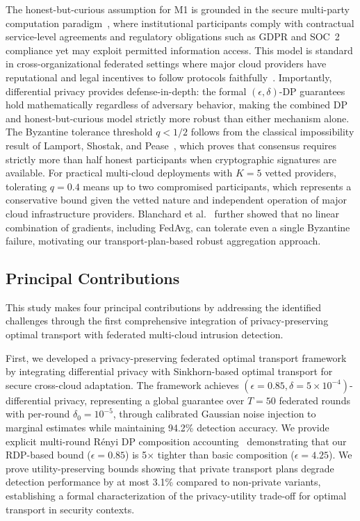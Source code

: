 \documentclass{ieeeaccess}
\theoremstyle{plain}
\theoremstyle{definition}
\theoremstyle{remark}
\begin{document}
The honest-but-curious assumption for M1 is grounded in the secure multi-party computation paradigm~\cite{goldreich2004}, where institutional participants comply with contractual service-level agreements and regulatory obligations such as GDPR and SOC~2 compliance yet may exploit permitted information access. This model is standard in cross-organizational federated settings where major cloud providers have reputational and legal incentives to follow protocols faithfully~\cite{kairouz2021}. Importantly, differential privacy provides defense-in-depth: the formal $(\epsilon, \delta)$-DP guarantees hold mathematically regardless of adversary behavior, making the combined DP and honest-but-curious model strictly more robust than either mechanism alone. The Byzantine tolerance threshold $q < 1/2$ follows from the classical impossibility result of Lamport, Shostak, and Pease~\cite{lamport1982}, which proves that consensus requires strictly more than half honest participants when cryptographic signatures are available. For practical multi-cloud deployments with $K = 5$ vetted providers, tolerating $q = 0.4$ means up to two compromised participants, which represents a conservative bound given the vetted nature and independent operation of major cloud infrastructure providers. Blanchard et al.~\cite{blanchard2017} further showed that no linear combination of gradients, including FedAvg, can tolerate even a single Byzantine failure, motivating our transport-plan-based robust aggregation approach.

\subsection{Principal Contributions}

This study makes four principal contributions by addressing the identified challenges through the first comprehensive integration of privacy-preserving optimal transport with federated multi-cloud intrusion detection.

First, we developed a privacy-preserving federated optimal transport framework by integrating differential privacy with Sinkhorn-based optimal transport for secure cross-cloud adaptation. The framework achieves $(\epsilon = 0.85, \delta = 5 \times 10^{-4})$-differential privacy, representing a global guarantee over $T = 50$ federated rounds with per-round $\delta_0 = 10^{-5}$, through calibrated Gaussian noise injection to marginal estimates while maintaining 94.2\% detection accuracy. We provide explicit multi-round R\'{e}nyi DP composition accounting~\cite{mironov2017} demonstrating that our RDP-based bound ($\epsilon = 0.85$) is 5$\times$ tighter than basic composition ($\epsilon = 4.25$). We prove utility-preserving bounds showing that private transport plans degrade detection performance by at most 3.1\% compared to non-private variants, establishing a formal characterization of the privacy-utility trade-off for optimal transport in security contexts.
\end{document}
